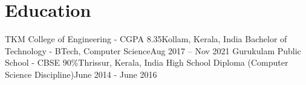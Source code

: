 \section{Education}
  \resumeSubHeadingListStart
    \resumeHeading
      {TKM College of Engineering - CGPA 8.35}{Kollam, Kerala, India}
      {Bachelor of Technology - BTech, Computer Science}{Aug 2017 -- Nov 2021}
    \resumeHeading
      {Gurukulam Public School - CBSE 90\%}{Thrissur, Kerala, India}
      {High School Diploma (Computer Science Discipline)}{June 2014 - June 2016}
  \resumeSubHeadingListEnd

